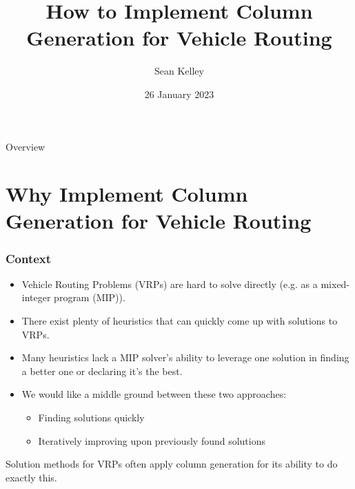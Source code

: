 \documentclass{beamer}
\title[VRP Column Generation]{How to Implement Column Generation for Vehicle Routing}
\author{Sean Kelley} %
\date{26 January 2023} %
\begin{document}
	
	\begin{frame}
		\titlepage %
	\end{frame}

	\begin{frame}{Overview}
		\tableofcontents
	\end{frame}

	\section{Why Implement Column Generation for Vehicle Routing}
	
	\begin{frame}[t]
		\frametitle{Context}
		\begin{itemize}
			\item Vehicle Routing Problems (VRPs) are hard to solve directly (e.g. as a mixed-integer program (MIP)).
			\item There exist plenty of heuristics that can quickly come up with solutions to VRPs.
			\item Many heuristics lack a MIP solver’s ability to leverage one solution in finding a better one or declaring it’s the best.
			\item We would like a middle ground between these two approaches:
			\begin{itemize}
				\item Finding solutions quickly
				\item Iteratively improving upon previously found solutions
			\end{itemize}
		\end{itemize}
		\vspace{1.25cm}
		\begin{block}{}
			Solution methods for VRPs often apply column generation for its ability to do exactly this.
		\end{block}
	\end{frame}
\end{document}
